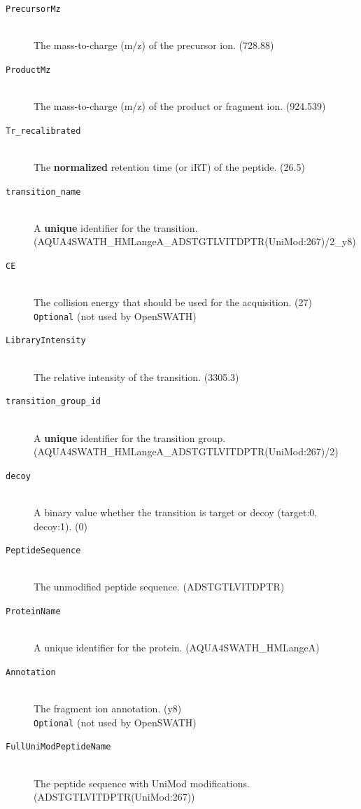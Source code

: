 \begin{description}
  \item[\texttt{PrecursorMz}] \hfill \\
  The mass-to-charge (m/z) of the precursor ion. (728.88)
  \item[\texttt{ProductMz}] \hfill \\
  The mass-to-charge (m/z) of the product or fragment ion. (924.539)
  \item[\texttt{Tr\_recalibrated}] \hfill \\
  The \textbf{normalized} retention time (or iRT) \cite{Escher2012Using} of the peptide. (26.5)
  \item[\texttt{transition\_name}] \hfill \\
  A \textbf{unique} identifier for the transition.\\
  (AQUA4SWATH\_HMLangeA\_ADSTGTLVITDPTR(UniMod:267)/2\_y8)
  \item[\texttt{CE}] \hfill \\
  The collision energy that should be used for the acquisition. (27)\\
  \texttt{Optional} (not used by OpenSWATH)
  \item[\texttt{LibraryIntensity}] \hfill \\
  The relative intensity of the transition. (3305.3)
  \item[\texttt{transition\_group\_id}] \hfill \\
  A \textbf{unique} identifier for the transition group.\\
  (AQUA4SWATH\_HMLangeA\_ADSTGTLVITDPTR(UniMod:267)/2)
  \item[\texttt{decoy}] \hfill \\
  A binary value whether the transition is target or decoy (target:0, decoy:1). (0)
  \item[\texttt{PeptideSequence}] \hfill \\
  The unmodified peptide sequence. (ADSTGTLVITDPTR)
  \item[\texttt{ProteinName}] \hfill \\
  A unique identifier for the protein. (AQUA4SWATH\_HMLangeA)
  \item[\texttt{Annotation}] \hfill \\
  The fragment ion annotation. (y8)\\
  \texttt{Optional} (not used by OpenSWATH)
  \item[\texttt{FullUniModPeptideName}] \hfill \\
  The peptide sequence with UniMod modifications. (ADSTGTLVITDPTR(UniMod:267))

\end{description}
